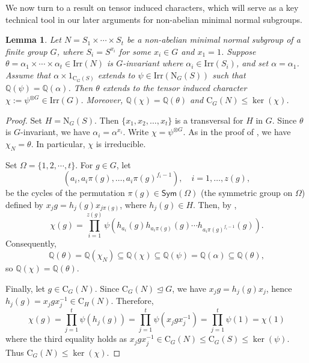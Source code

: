 \documentclass[10pt]{article}
\newtheorem{lem}{\bf Lemma}[section]
\begin{document}
We now turn to a result on tensor induced characters, which will serve as a key technical tool in our later  
arguments for non-abelian minimal normal subgroups.


\begin{lem}\label{lem: tensor induction}
	Let $N=S_1\times \cdots \times S_t$ be a non-abelian minimal normal subgroup
	of a finite group $G$,
  where $S_i=S^{x_i}$ for some $x_i\in G$ and $x_1=1$.
  Suppose $\theta=\alpha_1\times \cdots \times \alpha_t\in \mathrm{Irr}(N)$ is $G$-invariant where $\alpha_i\in \mathrm{Irr}(S_i)$, and set $\alpha=\alpha_1$.
    Assume that $\alpha \times 1_{\mathrm{C}_{G}(S)}$ extends to $\psi \in \mathrm{Irr}(\mathrm{N}_{G}(S))$
	such that $\mathbb{Q}(\psi)=\mathbb{Q}(\alpha)$.
	Then $\theta$ extends to the tensor induced character $\chi:=\psi^{\otimes G}\in \mathrm{Irr}(G)$.
  Moreover, $\mathbb{Q}(\chi) =\mathbb{Q}(\theta)$ and $\mathrm{C}_{G}(N)\leq \ker(\chi)$.
\end{lem}
\begin{proof}
	Set $ H = \mathrm{N}_G(S) $. 
  Then $ \{x_1, x_2,\ldots, x_t\} $ is a transversal for $ H $ in $ G $.
  Since $\theta$ is $G$-invariant, we have $\alpha_i=\alpha^{x_i}$.
  Write $\chi=\psi^{\otimes G}$.
	As in the proof of \cite[Corollary 10.5]{navarro18}, we have $\chi_N=\theta$.
  In particular, $\chi$ is irreducible. 
	



  Set $\Omega=\{ 1,2,\cdots ,t \}$.
  For $g\in G$,
  let 
  \[(a_i, a_i \pi(g), \ldots, a_i \pi(g)^{f_i - 1}),\quad i=1,\dots,z(g),\]
  be the cycles of the permutation $\pi(g)\in \mathsf{Sym}(\Omega)$ (the symmetric group on $\Omega$)
   defined by $x_j g = h_j(g)x_{j\pi(g)}$, where $h_j(g)\in H$.
  Then, by \cite[Theorem 25.3]{huppert98},
	\[
	\chi(g)=\prod_{i=1}^{z(g)} \psi(h_{a_i}(g)h_{a_i\pi(g)}(g)\cdots h_{a_i\pi(g)^{f_i-1}}(g)).
	\]
		Consequently,
	$$\mathbb{Q}(\theta)=\mathbb{Q}(\chi_N)\subseteq \mathbb{Q}(\chi)\subseteq \mathbb{Q}(\psi)=\mathbb{Q}(\alpha)\subseteq \mathbb{Q}(\theta),$$
  so $\mathbb{Q}(\chi)=\mathbb{Q}(\theta)$.
    
  Finally, let $g\in \mathrm{C}_{G}(N)$.
	Since $\mathrm{C}_{G}(N)\unlhd G$, 
  we have $x_jg=h_j(g)x_j$, hence $h_j(g)=x_jg x_j^{-1}\in \mathrm{C}_{H}(N)$.
  Therefore, 
	\[
	 \chi(g)=\prod_{j=1}^{t} \psi(h_j(g))=\prod_{j=1}^{t} \psi(x_jg x_j^{-1})=\prod_{j=1}^{t} \psi(1)=\chi(1)
	\]
    where the third equality holds as $x_jg x_j^{-1}\in \mathrm{C}_{G}(N)\leq \mathrm{C}_G(S)\leq \ker(\psi)$.
    Thus $\mathrm{C}_{G}(N)\leq \ker(\chi)$.
\end{proof}
\end{document}
